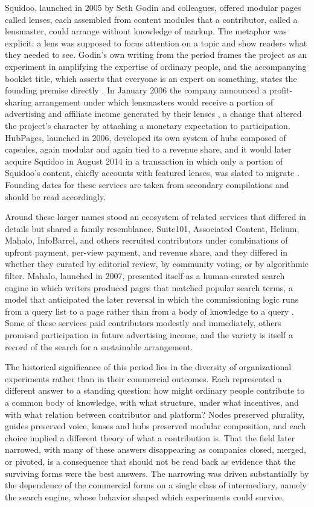 \documentclass[11pt]{article}
\theoremstyle{remark}
\begin{document}
Squidoo, launched in 2005 by Seth Godin and colleagues, offered modular pages called lenses, each assembled from content modules that a contributor, called a lensmaster, could arrange without knowledge of markup. The metaphor was explicit: a lens was supposed to focus attention on a topic and show readers what they needed to see. Godin's own writing from the period frames the project as an experiment in amplifying the expertise of ordinary people, and the accompanying booklet title, which asserts that everyone is an expert on something, states the founding premise directly \cite{godin2005}. In January 2006 the company announced a profit-sharing arrangement under which lensmasters would receive a portion of advertising and affiliate income generated by their lenses \cite{wikisquidoo}, a change that altered the project's character by attaching a monetary expectation to participation. HubPages, launched in 2006, developed its own system of hubs composed of capsules, again modular and again tied to a revenue share, and it would later acquire Squidoo in August 2014 in a transaction in which only a portion of Squidoo's content, chiefly accounts with featured lenses, was slated to migrate \cite{zeckman2014,wikihubpages}. Founding dates for these services are taken from secondary compilations and should be read accordingly.

Around these larger names stood an ecosystem of related services that differed in details but shared a family resemblance. Suite101, Associated Content, Helium, Mahalo, InfoBarrel, and others recruited contributors under combinations of upfront payment, per-view payment, and revenue share, and they differed in whether they curated by editorial review, by community voting, or by algorithmic filter. Mahalo, launched in 2007, presented itself as a human-curated search engine in which writers produced pages that matched popular search terms, a model that anticipated the later reversal in which the commissioning logic runs from a query list to a page rather than from a body of knowledge to a query \cite{mcgee2013real}. Some of these services paid contributors modestly and immediately, others promised participation in future advertising income, and the variety is itself a record of the search for a sustainable arrangement.

The historical significance of this period lies in the diversity of organizational experiments rather than in their commercial outcomes. Each represented a different answer to a standing question: how might ordinary people contribute to a common body of knowledge, with what structure, under what incentives, and with what relation between contributor and platform? Nodes preserved plurality, guides preserved voice, lenses and hubs preserved modular composition, and each choice implied a different theory of what a contribution is. That the field later narrowed, with many of these answers disappearing as companies closed, merged, or pivoted, is a consequence that should not be read back as evidence that the surviving forms were the best answers. The narrowing was driven substantially by the dependence of the commercial forms on a single class of intermediary, namely the search engine, whose behavior shaped which experiments could survive.
\end{document}
